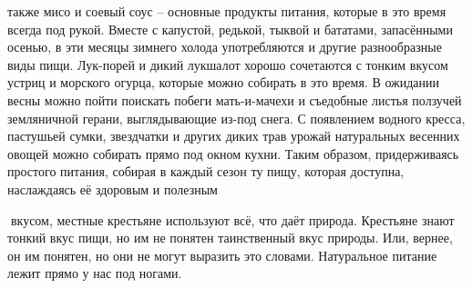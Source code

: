 \documentclass[a4paper]{book}
\begin{document}
также мисо и соевый соус – основные продукты питания, которые в это время всегда под
рукой. Вместе с капустой, редькой, тыквой и бататами, запасёнными осенью, в эти месяцы
зимнего холода употребляются и другие разнообразные виды пищи. Лук-порей и дикий лукшалот хорошо сочетаются с тонким вкусом устриц и морского огурца, которые можно
собирать в это время.
В ожидании весны можно пойти поискать побеги мать-и-мачехи и съедобные листья
ползучей земляничной герани, выглядывающие из-под снега. С появлением водного кресса,
пастушьей сумки, звездчатки и других диких трав урожай натуральных весенних овощей
можно собирать прямо под окном кухни. Таким образом, придерживаясь простого питания,
собирая в каждый сезон ту пищу, которая доступна, наслаждаясь её здоровым и полезным

вкусом, местные крестьяне используют всё, что даёт природа.
Крестьяне знают тонкий вкус пищи, но им не понятен таинственный вкус природы.
Или, вернее, он им понятен, но они не могут выразить это словами.
Натуральное питание лежит прямо у нас под ногами.
\end{document}
